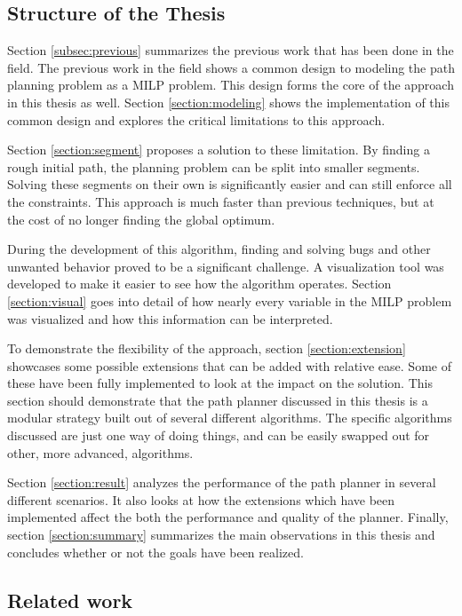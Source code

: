 \subsection{Structure of the Thesis}
Section \ref{subsec:previous} summarizes the previous work that has been done in the field.
The previous work in the field shows a common design to modeling the path planning problem as a MILP problem. This design forms the core of the approach in this thesis as well. Section \ref{section:modeling} shows the implementation of this common design and explores the critical limitations to this approach.
\par
Section \ref{section:segment} proposes a solution to these limitation. By finding a rough initial path, the planning problem can be split into smaller segments. Solving these segments on their own is significantly easier and can still enforce all the constraints. This approach is much faster than previous techniques, but at the cost of no longer finding the global optimum.
\par
During the development of this algorithm, finding and solving bugs and other unwanted behavior proved to be a significant challenge. A visualization tool was developed to make it easier to see how the algorithm operates. Section \ref{section:visual} goes into detail of how nearly every variable in the MILP problem was visualized and how this information can be interpreted.
\par
To demonstrate the flexibility of the approach, section \ref{section:extension} showcases some possible extensions that can be added with relative ease. Some of these have been fully implemented to look at the impact on the solution. This section should demonstrate that the path planner discussed in this thesis is a modular strategy built out of several different algorithms. The specific algorithms discussed are just one way of doing things, and can be easily swapped out for other, more advanced, algorithms. 
\par
Section \ref{section:result} analyzes the performance of the path planner in several different scenarios. It also looks at how the extensions which have been implemented affect the both the performance and quality of the planner.
Finally, section \ref{section:summary} summarizes the main observations in this thesis and concludes whether or not the goals have been realized.

\subsection{Related work}

